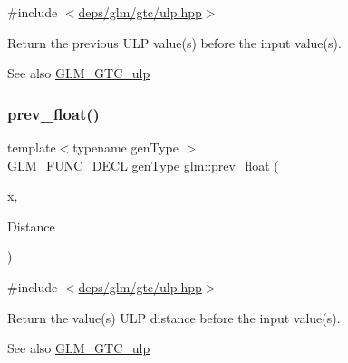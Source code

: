 {\ttfamily \#include $<$\hyperlink{ulp_8hpp}{deps/glm/gtc/ulp.\+hpp}$>$}

Return the previous U\+LP value(s) before the input value(s). \begin{DoxySeeAlso}{See also}
\hyperlink{group__gtc__ulp}{G\+L\+M\+\_\+\+G\+T\+C\+\_\+ulp} 
\end{DoxySeeAlso}
\mbox{\label{group__gtc__ulp_gaa399d5b6472a70e8952f9b26ecaacdec}} 
\subsubsection{\texorpdfstring{prev\+\_\+float()}{prev\_float()}\hspace{0.1cm}{\footnotesize\ttfamily [2/2]}}
{\footnotesize\ttfamily template$<$typename gen\+Type $>$ \\
G\+L\+M\+\_\+\+F\+U\+N\+C\+\_\+\+D\+E\+CL gen\+Type glm\+::prev\+\_\+float (\begin{DoxyParamCaption}\item[{gen\+Type const \&}]{x,  }\item[{\hyperlink{group__core__precision_ga4fd29415871152bfb5abd588334147c8}{uint} const \&}]{Distance }\end{DoxyParamCaption})}



{\ttfamily \#include $<$\hyperlink{ulp_8hpp}{deps/glm/gtc/ulp.\+hpp}$>$}

Return the value(s) U\+LP distance before the input value(s). \begin{DoxySeeAlso}{See also}
\hyperlink{group__gtc__ulp}{G\+L\+M\+\_\+\+G\+T\+C\+\_\+ulp} 
\end{DoxySeeAlso}
